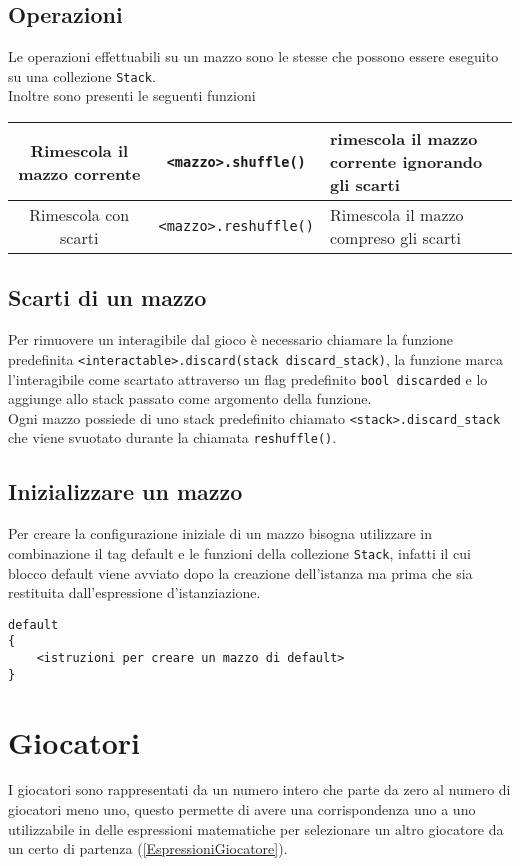 \subsection{Operazioni}
Le operazioni effettuabili su un mazzo sono le stesse che possono essere eseguito su una 
collezione \lstinline|Stack|. \\
Inoltre sono presenti le seguenti funzioni
\begin{center}
\begin{tabular}{|c|c|p{5cm}|}
    \hline
    Rimescola il mazzo corrente & \lstinline|<mazzo>.shuffle()| & rimescola il mazzo corrente ignorando gli scarti \\
    \hline
    Rimescola con scarti & \lstinline|<mazzo>.reshuffle()| & Rimescola il mazzo compreso gli scarti \\ 
    \hline
\end{tabular}
\end{center}

\subsection{Scarti di un mazzo}
Per rimuovere un interagibile dal gioco è necessario chiamare la funzione predefinita 
\lstinline|<interactable>.discard(stack discard_stack)|, la funzione marca l'interagibile come scartato
attraverso un flag predefinito \lstinline|bool discarded| e lo aggiunge allo stack passato 
come argomento della funzione. \\
Ogni mazzo possiede di uno stack predefinito chiamato \lstinline|<stack>.discard_stack| che 
viene svuotato durante la chiamata \lstinline|reshuffle()|.

\subsection{Inizializzare un mazzo}
Per creare la configurazione iniziale di un mazzo bisogna utilizzare in combinazione il tag 
default e le funzioni della collezione \lstinline|Stack|,  
infatti il cui blocco default viene avviato dopo la creazione dell'istanza 
ma prima che sia restituita dall'espressione d'istanziazione. \\
\begin{lstlisting}
default
{
    <istruzioni per creare un mazzo di default> 
}
\end{lstlisting}


\section{Giocatori}
I giocatori sono rappresentati da un numero intero che parte da zero al numero di giocatori meno uno,
questo permette di avere una corrispondenza uno a uno utilizzabile in delle espressioni matematiche
per selezionare un altro giocatore da un certo di partenza (\ref{EspressioniGiocatore}). \\

